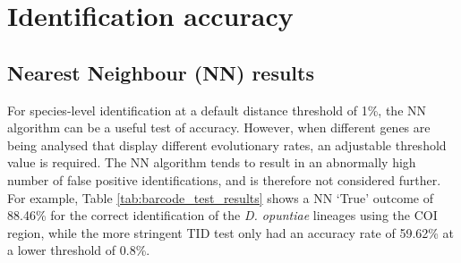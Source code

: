 \begin{landscape}

\end{landscape}

\section{Identification accuracy}

\subsection{Nearest Neighbour (NN) results}
For species-level identification at a default distance threshold of 1\%, the NN algorithm can be a useful test of accuracy. However, when different genes are being analysed that display different evolutionary rates, an adjustable threshold value is required. The NN algorithm tends to result in an abnormally high number of false positive identifications, and is therefore not considered further. For example, Table \ref{tab:barcode_test_results} shows a NN `True' outcome of 88.46\% for the correct identification of the \textit{D. opuntiae} lineages using the COI region, while the more stringent TID test only had an accuracy rate of 59.62\% at a lower threshold of 0.8\%.  

